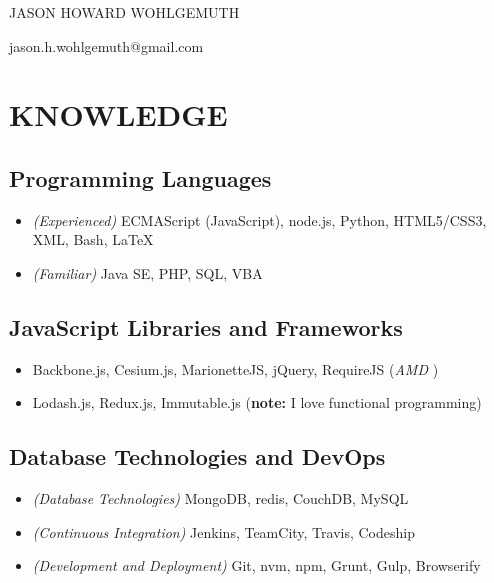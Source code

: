 \documentclass[10pt]{article}
\begin{document}
\begin{center}\Huge {JASON HOWARD WOHLGEMUTH}\end{center}
\begin{center}jason.h.wohlgemuth@gmail.com\end{center}

\section{KNOWLEDGE}\label{knowledge}

\subsection{Programming Languages}\label{programming-languages}

\begin{itemize}
\itemsep1pt\parskip0pt
\item
  \emph{(Experienced)} ECMAScript (JavaScript), node.js, Python,
  HTML5/CSS3, XML, Bash, LaTeX
\item
  \emph{(Familiar)} Java SE, PHP, SQL, VBA
\end{itemize}

\subsection{JavaScript Libraries and
Frameworks}\label{javascript-libraries-and-frameworks}

\begin{itemize}
\itemsep1pt\parskip0pt
\item
  Backbone.js, Cesium.js, MarionetteJS, jQuery, RequireJS (\emph{AMD })
\item
  Lodash.js, Redux.js, Immutable.js (\textbf{note:} I love functional
  programming)
\end{itemize}

\subsection{Database Technologies and
DevOps}\label{database-technologies-and-devops}

\begin{itemize}
\itemsep1pt\parskip0pt
\item
  \emph{(Database Technologies)} MongoDB, redis, CouchDB, MySQL
\item
  \emph{(Continuous Integration)} Jenkins, TeamCity, Travis, Codeship
\item
  \emph{(Development and Deployment)} Git, nvm, npm, Grunt, Gulp,
  Browserify
\end{itemize}
\end{document}
